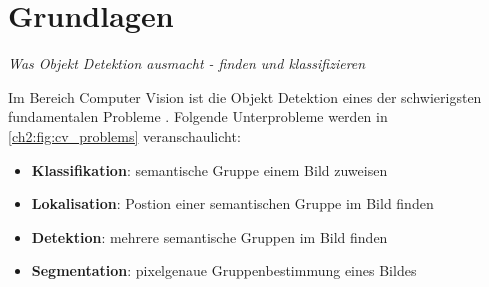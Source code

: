 \chapter{Grundlagen} \label{ch:background}

\begin{center}
    \textit{Was Objekt Detektion ausmacht - finden und klassifizieren}
\end{center}

Im Bereich Computer Vision ist die Objekt Detektion eines der schwierigsten fundamentalen Probleme \cite{szeliski_computer_2010}.
Folgende Unterprobleme werden in \autoref{ch2:fig:cv_problems} veranschaulicht:
\begin{itemize}
    \item \textbf{Klassifikation}: semantische Gruppe einem Bild zuweisen
    \item \textbf{Lokalisation}: Postion einer semantischen Gruppe im Bild finden
    \item \textbf{Detektion}: mehrere semantische Gruppen im Bild finden
    \item \textbf{Segmentation}: pixelgenaue Gruppenbestimmung eines Bildes
\end{itemize}

